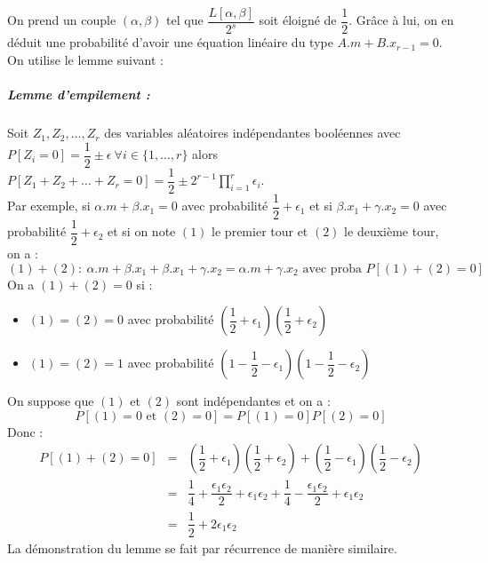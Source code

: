\documentclass[12pt,a4paper]{report}
\begin{document}
\begin{itemize}
On prend un couple $(\alpha,\beta)$ tel que $\dfrac{L[\alpha,\beta]}{2^s}$ soit éloigné de $\dfrac{1}{2}$. Grâce à lui, on en déduit une probabilité d'avoir une équation linéaire du type $A.m+B.x_{r-1}=0$. On utilise le lemme suivant :
\subparagraph{Lemme d'empilement :} Soit $Z_1,Z_2,\ldots,Z_r$ des variables aléatoires indépendantes booléennes avec $P[Z_i = 0]=\dfrac{1}{2} \pm \epsilon\ \forall i \in \{1,\ldots,r\}$ alors $P[Z_1+Z_2+\ldots+Z_r=0] = \dfrac{1}{2} \pm 2^{r-1} \displaystyle \prod_{i=1}^r \epsilon_i $.\\
Par exemple, si $\alpha.m+\beta.x_1 = 0$ avec probabilité $\dfrac{1}{2} + \epsilon_1$  et si $\beta.x_1+\gamma.x_2 = 0$ avec probabilité $\dfrac{1}{2}+\epsilon_2$ et si on note $(1)$ le premier tour et $(2)$ le deuxième tour, on a :
$$(1)+(2):\ \alpha.m+\beta.x_1+\beta.x_1+\gamma.x_2 = \alpha.m+\gamma.x_2 \mbox{ avec proba } P[(1)+(2)=0] $$
On a $(1)+(2) = 0$ si :
\begin{itemize}
\item $(1)=(2) = 0$ avec probabilité $\left(\dfrac{1}{2}+\epsilon_1\right)\left(\dfrac{1}{2}+\epsilon_2\right)$
\item $(1)=(2)=1$ avec probabilité $\left(1-\dfrac{1}{2}-\epsilon_1\right)\left(1-\dfrac{1}{2}-\epsilon_2\right)$
\end{itemize}
On suppose que $(1)$ et $(2)$ sont indépendantes et on a : $$P[(1)=0 \mbox{ et } (2) = 0]=P[(1)=0]P[(2)=0]$$ Donc :
\begin{eqnarray*}
  P[(1)+(2) = 0] &=& \left(\dfrac{1}{2}+\epsilon_1\right)\left(\dfrac{1}{2}+\epsilon_2\right) + \left(\dfrac{1}{2}-\epsilon_1\right)\left(\dfrac{1}{2}-\epsilon_2\right) \\
                &=& \dfrac{1}{4} + \dfrac{\epsilon_1\epsilon_2}{2} + \epsilon_1\epsilon_2 +  \dfrac{1}{4} - \dfrac{\epsilon_1\epsilon_2}{2} +  \epsilon_1\epsilon_2 \\
                &=& \dfrac{1}{2} + 2 \epsilon_1\epsilon_2
\end{eqnarray*}
La démonstration du lemme se fait par récurrence de manière similaire.
\end{itemize}
\end{document}
